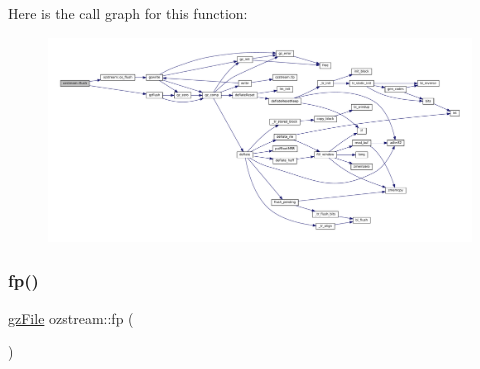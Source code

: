 Here is the call graph for this function\+:
\nopagebreak
\begin{figure}[H]
\begin{center}
\leavevmode
\includegraphics[width=350pt]{classozstream_a0fc1b5181044b8d6b6aed0381e8f449c_cgraph}
\end{center}
\end{figure}
\mbox{\label{classozstream_ab1743675ebfa7173c06f803f41844b18}} 
\subsubsection{\texorpdfstring{fp()}{fp()}}
{\footnotesize\ttfamily \mbox{\hyperlink{zlib_8h_a8e80bd9e2c359bc5bdabb2e97b4e62bf}{gz\+File}} ozstream\+::fp (\begin{DoxyParamCaption}{ }\end{DoxyParamCaption})\hspace{0.3cm}{\ttfamily [inline]}}

